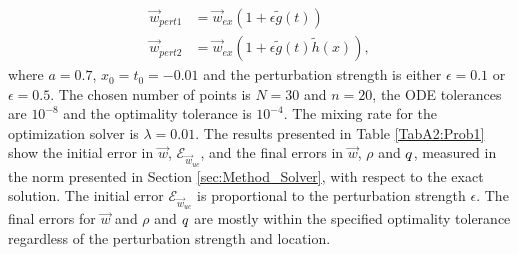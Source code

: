 \begin{align*}
\vec{w}_{pert1} &= \vec{w}_{ex}(1+ \epsilon \tilde g(t))\\
\vec{w}_{pert2} &= \vec{w}_{ex}(1+ \epsilon \tilde g(t) \tilde h(x)),
\end{align*}
where $a = 0.7$, $x_0 = t_0 = -0.01$ and the perturbation strength is either $\epsilon = 0.1$ or $\epsilon = 0.5$.
The chosen number of points is $N =30$ and $n=20$, the ODE tolerances are $10^{-8}$ and the optimality tolerance is $10^{-4}$. The mixing rate for the optimization solver is $\lambda = 0.01$.
The results presented in Table \ref{TabA2:Prob1} show the initial error in $\vec{w}$, $\mathcal{E}_{\vec{w}_{uc}}$, and the final errors in $\vec{w}$, $\rho$ and $q$, measured in the norm presented in Section \ref{sec:Method_Solver}, with respect to the exact solution. The initial error $\mathcal{E}_{\vec{w}_{uc}}$ is proportional to the perturbation strength $\epsilon$. The final errors for $\vec{w}$ and $\rho$ and $q$ are mostly within the specified optimality tolerance regardless of the perturbation strength and location. 


